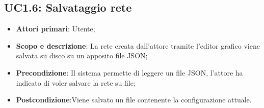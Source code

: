 \subsection{UC1.6: Salvataggio rete} 
\hypertarget{UC1.6}{} 
\begin{itemize} 
	\item{\textbf{Attori primari}: Utente;} 
	\item{\textbf{Scopo e descrizione}: La rete creata dall'attore tramite l'editor grafico viene salvata su disco su un apposito file JSON;} 
	\item{ \textbf{Precondizione}: Il sistema permette di leggere un file JSON, l'attore ha indicato di voler salvare la rete su file;} 
	\item{\textbf{Postcondizione}:Viene salvato un file contenente la configurazione attuale.} 
\end{itemize} 
